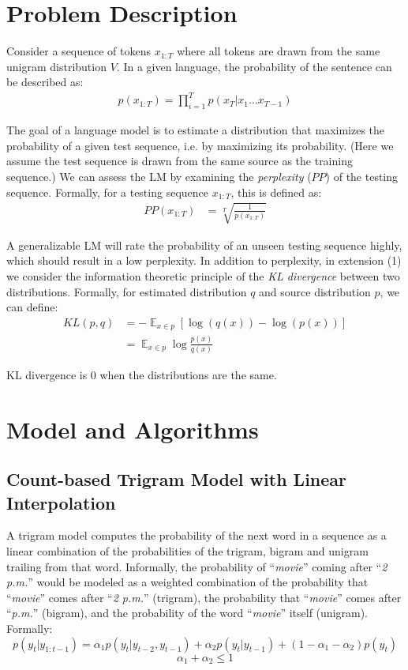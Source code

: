 \documentclass[11pt]{article}
\DeclareMathOperator*{\E}{\mathbb{E}}
\begin{document}
\section{Problem Description}

Consider a sequence of tokens $x_{1:T}$ where all tokens are drawn from the same unigram distribution $V$. In a given language, the probability of the sentence can be described as:
\begin{align*}
  p(x_{1:T}) = \prod_{i=1}^{T} p(x_{T} | x_1 ... x_{T-1})
\end{align*}

The goal of a language model is to estimate a distribution that maximizes the probability of a given test sequence, i.e. by maximizing its probability. (Here we assume the test sequence is drawn from the same source as the training sequence.) We can assess the LM by examining the \textit{perplexity} ($PP$) of the testing sequence. Formally, for a testing sequence $x_{1:T}$, this is defined as:
\begin{align*}
  PP(x_{1:T}) &= \sqrt[T]{\frac{1}{p(x_{1:T})}}
\end{align*}

A generalizable LM will rate the probability of an unseen testing sequence highly, which should result in a low perplexity. In addition to perplexity, in extension (1) we consider the information theoretic principle of the \textit{KL divergence} between two distributions. Formally, for estimated distribution $q$ and source distribution $p$, we can define:
\begin{align*}
  KL(p,q) &= - \E_{x\in p} [\log(q(x)) - \log(p(x))] \\
  &= \E_{x\in p} \log \frac{p(x)}{q(x)}
\end{align*}

KL divergence is 0 when the distributions are the same.

\section{Model and Algorithms}

\subsection{Count-based Trigram Model with Linear Interpolation}

A trigram model computes the probability of the next word in a sequence as a linear combination of the probabilities of the trigram, bigram and unigram trailing from that word. Informally, the probability of ``\textit{movie}'' coming after ``\textit{2 p.m.}'' would be modeled as a weighted combination of the probability that ``\textit{movie}'' comes after ``\textit{2 p.m.}'' (trigram), the probability that ``\textit{movie}'' comes after ``\textit{p.m.}'' (bigram), and the probability of the word ``\textit{movie}'' itself (unigram). Formally:
$$p(y_t | y_{1:t-1}) = \alpha_1 p(y_t | y_{t-2}, y_{t-1}) + \alpha_2 p(y_t | y_{t-1}) + (1 - \alpha_1 - \alpha_2) p(y_t)$$
$$\alpha_1 + \alpha_2 \leq 1$$
\end{document}
